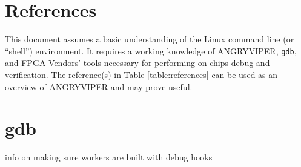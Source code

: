 \newpage

\tableofcontents

\newpage

\section{References}

	This document assumes a basic understanding of the Linux command line (or ``shell'') environment. It requires a working knowledge of ANGRYVIPER, \texttt{gdb}, and FPGA Vendors' tools necessary for performing on-chips debug and verification. The reference(s) in Table \ref{table:references} can be used as an overview of ANGRYVIPER and may prove useful.
\def\myreferences{
\hline
ChipScope Pro\footnote{Full title: ``ChipScope Pro Software and Cores (UG029)''} & Xilinx &
\url{http://www.xilinx.com/support/documentation/sw_manuals/xilinx14_7/chipscope_pro_sw_cores_ug029.pdf}
\\
}

\newpage
\section{gdb}
info on making sure workers are built with debug hooks
